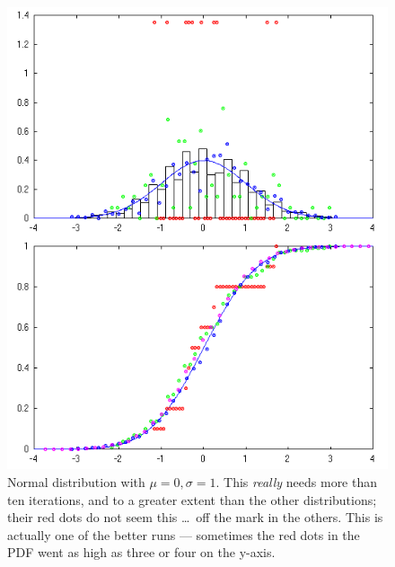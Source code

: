 \documentclass[letterpaper]{article}
\begin{document}
\begin{figure}[ht]
  \centering
  \includegraphics[width=\columnwidth]{2015-11-11_normal.png}
  \caption{\label{fig:dNormG} Normal distribution with $\mu=0, \sigma=1$.  This
    \emph{really} needs more than ten iterations, and to a greater extent than
    the other distributions; their red dots do not seem this \ldots\ off the
    mark in the others.  This is actually one of the better runs --- sometimes
    the red dots in the PDF went as high as three or four on the y-axis.}
\end{figure}
\end{document}
